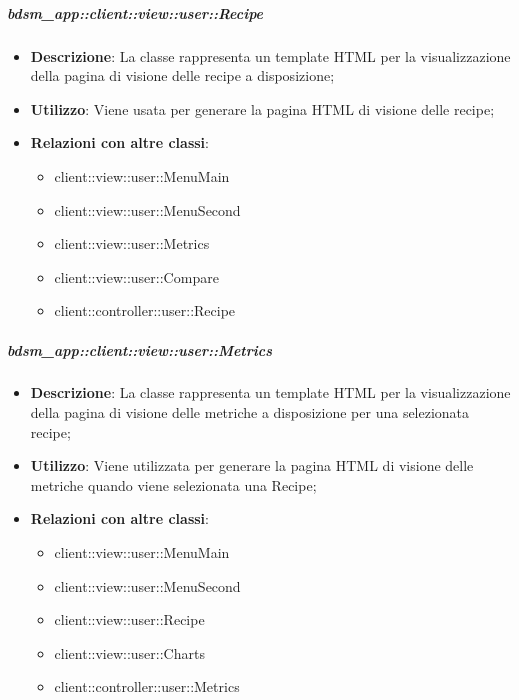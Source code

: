 		\subparagraph{bdsm\_app::client::view::user::Recipe} %
		\label{subp:bdsm_app_client_view_user_recipe}
			\begin{itemize}
				\item \textbf{Descrizione}: La classe rappresenta un template HTML per la visualizzazione della pagina di visione delle recipe a disposizione;
				\item \textbf{Utilizzo}: Viene usata per generare la pagina HTML di visione delle recipe;
				\item \textbf{Relazioni con altre classi}: 		
					\begin{itemize}
						\item client::view::user::MenuMain
						\item client::view::user::MenuSecond
						\item client::view::user::Metrics
						\item client::view::user::Compare
						\item client::controller::user::Recipe
					\end{itemize}
			\end{itemize}

		\subparagraph{bdsm\_app::client::view::user::Metrics} %
		\label{subp:bdsm_app_client_view_metrics}
			\begin{itemize}
				\item \textbf{Descrizione}: La classe rappresenta un template HTML per la visualizzazione della pagina di visione delle metriche a disposizione per una selezionata recipe;
				\item \textbf{Utilizzo}: Viene utilizzata per generare la pagina HTML di visione delle metriche quando viene selezionata una Recipe;
				\item \textbf{Relazioni con altre classi}: 		
					\begin{itemize}
						\item client::view::user::MenuMain
						\item client::view::user::MenuSecond
						\item client::view::user::Recipe
						\item client::view::user::Charts
						\item client::controller::user::Metrics
					\end{itemize}
			\end{itemize}

